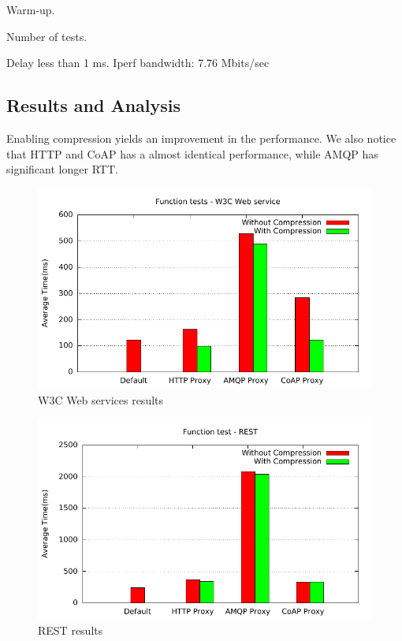 Warm-up.

Number of tests.

Delay less than 1 ms.
Iperf bandwidth: 7.76 Mbits/sec


\subsection{Results and Analysis}

Enabling compression yields an improvement in the performance. We also notice
that HTTP and CoAP has a almost identical performance, while AMQP has
significant longer RTT.

\begin{figure}[H]
\center
\includegraphics[scale=0.75]{../results/function_tests/nffi/out.pdf}
\caption{W3C Web services results}
\end{figure}

\begin{figure}[H]
\center
\includegraphics[scale=0.75]{../results/function_tests/rest/out.pdf}
\caption{REST results}
\end{figure}



